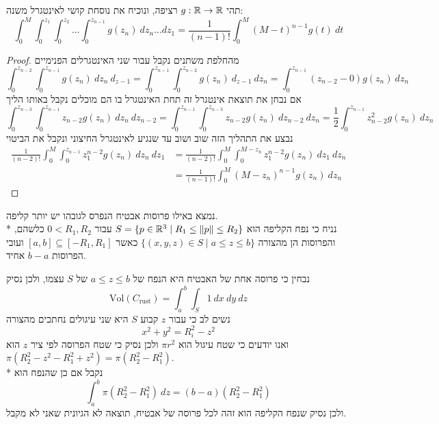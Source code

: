 \Subquestion{}
תהי $g : \mathbb{R} \to \mathbb{R}$ רציפה, ונוכיח את נוסחת קושי לאינטגרל משנה:
\[
	\int_{0}^{M}  \int_{0}^{z_1} \int_{0}^{z_2} \dots \int_{0}^{z_{n - 1}} g(z_n)\ dz_n \dots dz_1 = \frac{1}{(n - 1)!} \int_{0}^{M} {(M - t)}^{n - 1} g(t)\ dt
\]
\begin{proof}
	מהחלפת משתנים נקבל עבור שני האינטגרלים הפנימיים
	\[
		\int_{0}^{z_{n - 2}} \int_{0}^{z_{n - 1}} g(z_n)\ dz_n\ d_{z - 1}
		= \int_{0}^{z_{n - 1}} \int_{0}^{z_{n - 2}} g(z_n)\ d_{z - 1}\ dz_n
		= \int_{0}^{z_{n - 1}} (z_{n - 2} - 0) g(z_n)\ dz_n
	\]
	אם נבחן את תוצאת אינטגרל זה תחת האינטגרל בו הם מוכלים נקבל באותו הליך
	\[
		\int_{0}^{z_{n - 3}} \int_{0}^{z_{n - 1}} z_{n - 2} g(z_n)\ dz_n\ dz_{n - 2}
		= \int_{0}^{z_{n - 1}} \int_{0}^{z_{n - 3}} z_{n - 2} g(z_n)\ dz_{n - 2}\ dz_n
		= \frac{1}{2} \int_{0}^{z_{n - 1}} z_{n - 2}^2 g(z_n)\ dz_n
	\]
	נבצע את התהליך הזה שוב ושוב עד שנגיע לאינטגרל החיצוני ונקבל את הביטוי
	\begin{align*}
		\frac{1}{(n - 2)!} \int_{0}^{M} \int_{0}^{z_{n - 1}} z_1^{n - 2} g(z_n)\ dz_n\ dz_1
		& = \frac{1}{(n - 2)!} \int_{0}^{M} \int_{0}^{M - z_n} z_1^{n - 2} g(z_n)\ dz_1\ dz_n \\
		& = \frac{1}{(n - 1)!} \int_{0}^{M} {(M - z_n)}^{n - 1} g(z_n)\ dz_n
	\end{align*}
\end{proof}

\Question{}
נמצא באילו פרוסות אבטיח הנפרס לגובהו יש יותר קליפה. \\*
נניח כי נפח הקליפה הוא $S = \{ p \in \mathbb{R}^3 \mid R_1 \le \lVert p \rVert \le R_2 \}$ עבור $0 < R_1, R_2$ כלשהם,
והפרוסות הן מהצורה $\{ (x, y, z) \in S \mid a \le z \le b \}$ כאשר $[a, b] \subseteq [-R_1, R_1]$ ועובי הפרוסות $b - a$ אחיד.

נבחין כי פרוסה אחת של האבטיח היא הנפח של $a \le z \le b$ של $S$ עצמו, ולכן נסיק
\[
	\text{Vol}(C_{\text{rust}}) = \int_{a}^{b} \int_S 1\ dx\ dy\ dz
\]
נשים לב כי עבור $z$ קבוע $S$ היא שני עיגולים נחתכים מהצורה
\[
	x^2 + y^2 = R_i^2 - z^2
\]
ואנו יודעים כי שטח עיגול הוא $\pi r^2$ ולכן נסיק כי שטח הפרוסה לפי ציר $z$ הוא $\pi(R_2^2 - z^2 - R_1^2 + z^2) = \pi(R_2^2 - R_1^2)$. \\*
נקבל אם כן שהנפח הוא
\[
	\int_{a}^{b} \pi(R_2^2 - R_1^2)\ dz = (b - a)(R_2^2 - R_1^2)
\]
ולכן נסיק שנפח הקליפה הוא זהה לכל פרוסה של אבטיח, תוצאה לא הגיונית שאני לא מקבל.


